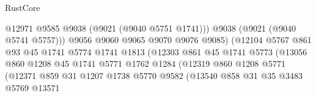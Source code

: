 \begin{lexlean}{RustCore}
\begin{coremodule}
                                            @12971
                                            @9585
                                            @9038
                                            (@9021 (@9040 @5751 @1741)))
                                          @9038
                                          (@9021 (@9040 @5741 @5757)))
                                        @9056
                                        @9060
                                        @9065
                                        @9070
                                        @9076
                                        @9085)
                                      (@12104
                                        @5767
                                        @861
                                        @93
                                        @45
                                        @1741
                                        @5774
                                        @1741
                                        @1813
                                        (@12303
                                          @861
                                          @45
                                          @1741
                                          @5773
                                          (@13056
                                            @860
                                            @1208
                                            @45
                                            @1741
                                            @5771
                                            @1762
                                            @1284
                                            (@12319
                                              @860
                                              @1208
                                              @5771
                                              (@12371
                                                @859
                                                @31
                                                @1207
                                                @1738
                                                @5770
                                                @9582
                                                (@13540
                                                  @858
                                                  @31
                                                  @35
                                                  @3483
                                                  @5769
                                                  @13571

\end{coremodule}
\end{lexlean}
